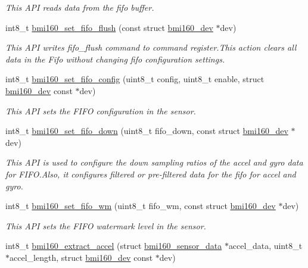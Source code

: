 \begin{DoxyCompactItemize}
\begin{DoxyCompactList}\small\item\em This A\+PI reads data from the fifo buffer. \end{DoxyCompactList}\item 
int8\+\_\+t \hyperlink{group__bmi160_ga0b471abfa1d28d5797b5de9c9b457a53}{bmi160\+\_\+set\+\_\+fifo\+\_\+flush} (const struct \hyperlink{structbmi160__dev}{bmi160\+\_\+dev} $\ast$dev)
\begin{DoxyCompactList}\small\item\em This A\+PI writes fifo\+\_\+flush command to command register.\+This action clears all data in the Fifo without changing fifo configuration settings. \end{DoxyCompactList}\item 
int8\+\_\+t \hyperlink{group__bmi160_gac5cead9788329ba97addba76997de01e}{bmi160\+\_\+set\+\_\+fifo\+\_\+config} (uint8\+\_\+t config, uint8\+\_\+t enable, struct \hyperlink{structbmi160__dev}{bmi160\+\_\+dev} const $\ast$dev)
\begin{DoxyCompactList}\small\item\em This A\+PI sets the F\+I\+FO configuration in the sensor. \end{DoxyCompactList}\item 
int8\+\_\+t \hyperlink{group__bmi160_ga50cbe9d86cba2bb6ef91fdaf3f2ce529}{bmi160\+\_\+set\+\_\+fifo\+\_\+down} (uint8\+\_\+t fifo\+\_\+down, const struct \hyperlink{structbmi160__dev}{bmi160\+\_\+dev} $\ast$dev)
\begin{DoxyCompactList}\small\item\em This A\+PI is used to configure the down sampling ratios of the accel and gyro data for F\+I\+F\+O.\+Also, it configures filtered or pre-\/filtered data for the fifo for accel and gyro. \end{DoxyCompactList}\item 
int8\+\_\+t \hyperlink{group__bmi160_gaa348ae8d5aa3b20363b49876abff5c69}{bmi160\+\_\+set\+\_\+fifo\+\_\+wm} (uint8\+\_\+t fifo\+\_\+wm, const struct \hyperlink{structbmi160__dev}{bmi160\+\_\+dev} $\ast$dev)
\begin{DoxyCompactList}\small\item\em This A\+PI sets the F\+I\+FO watermark level in the sensor. \end{DoxyCompactList}\item 
int8\+\_\+t \hyperlink{group__bmi160_gae548739f4185fa7fef8cb718ec6bd91d}{bmi160\+\_\+extract\+\_\+accel} (struct \hyperlink{structbmi160__sensor__data}{bmi160\+\_\+sensor\+\_\+data} $\ast$accel\+\_\+data, uint8\+\_\+t $\ast$accel\+\_\+length, struct \hyperlink{structbmi160__dev}{bmi160\+\_\+dev} const $\ast$dev)

\end{DoxyCompactItemize}
